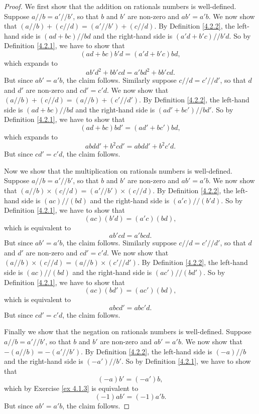 \begin{proof}
    We first show that the addition on rationals numbers is well-defined.
    Suppose \(a // b = a' // b'\), so that \(b\) and \(b'\) are non-zero and \(ab' = a'b\).
    We now show that \((a // b) + (c // d) = (a' // b') + (c // d)\).
    By Definition \ref{4.2.2}, the left-hand side is \((ad + bc) // bd\) and the right-hand side is \((a'd + b'c) // b'd\).
    So by Definition \ref{4.2.1}, we have to show that
    \[
        (ad + bc)b'd = (a'd + b'c)bd,
    \]
    which expands to
    \[
        ab'd^2 + bb'cd = a'bd^2 + bb'cd.
    \]
    But since \(ab' = a'b\), the claim follows.
    Similarly suppose \(c // d = c' // d'\), so that \(d\) and \(d'\) are non-zero and \(cd' = c'd\).
    We now show that \((a // b) + (c // d) = (a // b) + (c' // d')\).
    By Definition \ref{4.2.2}, the left-hand side is \((ad + bc) // bd\) and the right-hand side is \((ad' + bc') // bd'\).
    So by Definition \ref{4.2.1}, we have to show that
    \[
        (ad + bc)bd' = (ad' + bc')bd,
    \]
    which expands to
    \[
        abdd' + b^2cd' = abdd' + b^2c'd.
    \]
    But since \(cd' = c'd\), the claim follows.

    Now we show that the multiplication on rationals numbers is well-defined.
    Suppose \(a // b = a' // b'\), so that \(b\) and \(b'\) are non-zero and \(ab' = a'b\).
    We now show that \((a // b) \times (c // d) = (a' // b') \times (c // d)\).
    By Definition \ref{4.2.2}, the left-hand side is \((ac) // (bd)\) and the right-hand side is \((a'c) // (b'd)\).
    So by Definition \ref{4.2.1}, we have to show that
    \[
        (ac)(b'd) = (a'c)(bd),
    \]
    which is equivalent to
    \[
        ab'cd = a'bcd.
    \]
    But since \(ab' = a'b\), the claim follows.
    Similarly suppose \(c // d = c' // d'\), so that \(d\) and \(d'\) are non-zero and \(cd' = c'd\).
    We now show that \((a // b) \times (c // d) = (a // b) \times (c' // d')\).
    By Definition \ref{4.2.2}, the left-hand side is \((ac) // (bd)\) and the right-hand side is \((ac') // (bd')\).
    So by Definition \ref{4.2.1}, we have to show that
    \[
        (ac)(bd') = (ac')(bd),
    \]
    which is equivalent to
    \[
        abcd' = abc'd.
    \]
    But since \(cd' = c'd\), the claim follows.

    Finally we show that the negation on rationals numbers is well-defined.
    Suppose \(a // b = a' // b'\), so that \(b\) and \(b'\) are non-zero and \(ab' = a'b\).
    We now show that \(-(a // b) = -(a' // b')\).
    By Definition \ref{4.2.2}, the left-hand side is \((-a) // b\) and the right-hand side is \((-a') // b'\).
    So by Definition \ref{4.2.1}, we have to show that
    \[
        (-a)b' = (-a')b,
    \]
    which by Exercise \ref{ex 4.1.3} is equivalent to
    \[
        (-1)ab' = (-1)a'b.
    \]
    But since \(ab' = a'b\), the claim follows.
\end{proof}

